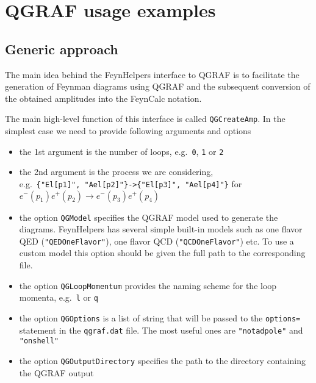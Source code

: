 \documentclass[../FeynHelpersManual.tex]{subfiles}
\begin{document}
\hypertarget{qgraf usage examples}{
\section{QGRAF usage examples}\label{qgraf usage examples}}

\hypertarget{generic-approach}{%
\subsection{Generic approach}\label{generic-approach}}

The main idea behind the FeynHelpers interface to QGRAF is to facilitate
the generation of Feynman diagrams using QGRAF and the subsequent
conversion of the obtained amplitudes into the FeynCalc notation.

The main high-level function of this interface is called
\texttt{QGCreateAmp}. In the simplest case we need to provide following
arguments and options

\begin{itemize}
\tightlist
\item
  the 1st argument is the number of loops, e.g.~\texttt{0}, \texttt{1}
  or \texttt{2}
\item
  the 2nd argument is the process we are considering,
  e.g.~\texttt{\{\allowbreak{}"El[\allowbreak{}p1]",\ \allowbreak{}"Ael[\allowbreak{}p2]"\}->\{\allowbreak{}"El[\allowbreak{}p3]",\ \allowbreak{}"Ael[\allowbreak{}p4]"\}}
  for \(e^- (p_1) e^+ (p_2) \to e^- (p_3) e^+ (p_4)\)
\item
  the option \texttt{QGModel} specifies the QGRAF model used to generate
  the diagrams. FeynHelpers has several simple built-in models such as
  one flavor QED (\texttt{"QEDOneFlavor"}), one flavor QCD
  (\texttt{"QCDOneFlavor"}) etc. To use a custom model this option
  should be given the full path to the corresponding file.
\item
  the option \texttt{QGLoopMomentum} provides the naming scheme for the
  loop momenta, e.g.~\texttt{l} or \texttt{q}
\item
  the option \texttt{QGOptions} is a list of string that will be passed
  to the \texttt{options=} statement in the \texttt{qgraf.dat} file. The
  most useful ones are \texttt{"notadpole"} and \texttt{"onshell"}
\item
  the option \texttt{QGOutputDirectory} specifies the path to the
  directory containing the QGRAF output
\end{itemize}
\end{document}
